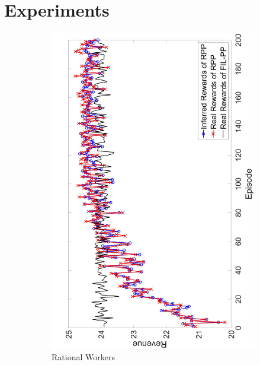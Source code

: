 \documentclass{article}
\begin{document}
\section{Experiments}
\begin{figure}[htb]
    \centering
    \begin{subfigure}[t]{0.32\textwidth}
        \centering
        \includegraphics[width=\textwidth]{image/1}
        \caption{\label{E1} Rational Workers}
    \end{subfigure}%
    ~
    \begin{subfigure}[t]{0.32\textwidth}
        \centering

\end{subfigure}
\end{figure}
\end{document}
